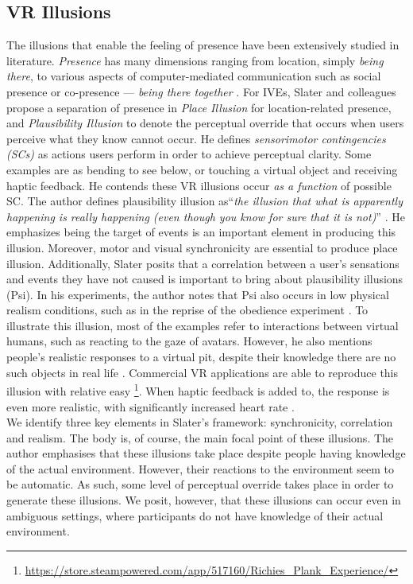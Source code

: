 \subsection{VR Illusions}
The illusions that enable the feeling of presence have been extensively studied in literature. 
\textit{Presence} has many dimensions ranging from location, simply \textit{being there}, to various aspects of computer-mediated communication such as social presence or co-presence --- \textit{being there together} \cite{zhao2003toward}.
For IVEs, Slater and colleagues propose a separation of presence in \textit{Place Illusion} for location-related presence, and \textit{Plausibility Illusion} to denote the perceptual override that occurs when users perceive what they know cannot occur. He defines \textit{sensorimotor contingencies (SCs)} as actions users perform in order to achieve perceptual clarity. Some examples are as bending to see below, or touching a virtual object and receiving haptic feedback. He contends these VR illusions occur \textit{as a function} of possible SC. The author defines plausibility illusion as``\textit{the illusion that what is apparently happening is really happening (even though you know for sure that it is not)}'' \cite{slater2009place}. He emphasizes being the target of events is an important element in producing this illusion. Moreover, motor and visual synchronicity are essential to produce place illusion. Additionally, Slater posits that a correlation between a user's sensations and events they have not caused is important to bring about plausibility illusions (Psi). In his experiments, the author notes that Psi also occurs in low physical realism conditions, such as in the reprise of the obedience experiment \cite{slater2006virtual}. To illustrate this illusion, most of the examples refer to interactions between virtual humans, such as reacting to the gaze of avatars. However, he also mentions people's realistic responses to a virtual pit, despite their knowledge there are no such objects in real life \cite{slater1995taking}. Commercial VR applications are able to reproduce this illusion with relative easy \footnote{\url{https://store.steampowered.com/app/517160/Richies_Plank_Experience/}}. When haptic feedback is added to, the response is even more realistic, with significantly increased heart rate \cite{meehan2002physiological}. 
\\
We identify three key elements in Slater's framework: synchronicity, correlation and realism. The body is, of course, the main focal point of these illusions. The author emphasises that these illusions take place despite people having knowledge of the actual environment. However, their reactions to the environment seem to be automatic. As such, some level of perceptual override takes place in order to generate these illusions. We posit, however, that these illusions can occur even in ambiguous settings, where participants do not have knowledge of their actual environment. 
